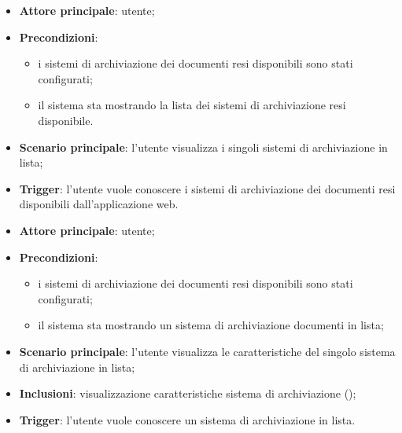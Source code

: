 \documentclass[10pt, a4paper]{article}
\begin{document}
    \begin{itemize}
        \item \textbf{Attore principale}: utente;
        \item \textbf{Precondizioni}: 
        \begin{itemize}
            \item i sistemi di archiviazione dei documenti resi disponibili sono stati configurati;
            \item il sistema sta mostrando la lista dei sistemi di archiviazione resi disponibile.
        \end{itemize}
        \item \textbf{Scenario principale}: l’utente visualizza i singoli sistemi di archiviazione in lista;
        \item \textbf{Trigger}: l’utente vuole conoscere i sistemi di archiviazione dei documenti resi disponibili dall’applicazione web.
    \end{itemize}
    
    \begin{itemize}
        \item \textbf{Attore principale}: utente;
        \item \textbf{Precondizioni}: 
        \begin{itemize}
            \item i sistemi di archiviazione dei documenti resi disponibili sono stati configurati;
            \item il sistema sta mostrando un sistema di archiviazione documenti in lista;
        \end{itemize}
        \item \textbf{Scenario principale}: l'utente visualizza le caratteristiche del singolo sistema di archiviazione in lista;
        \item \textbf{Inclusioni}: visualizzazione caratteristiche sistema di archiviazione ();
        \item \textbf{Trigger}: l’utente vuole conoscere un sistema di archiviazione in lista.
    \end{itemize}
\end{document}
